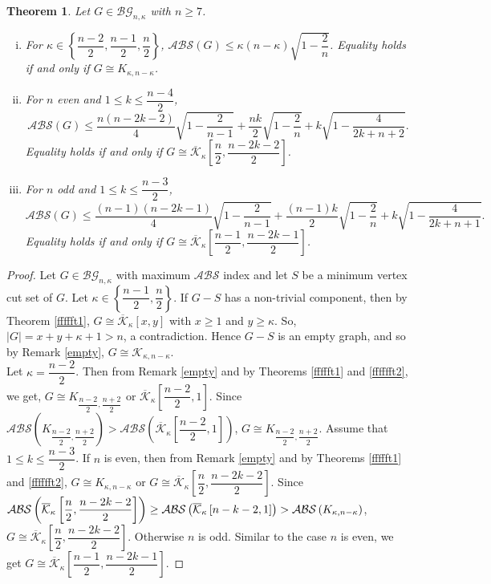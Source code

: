 \documentclass[12pt]{article}
\newtheorem{theorem}{Theorem}[section]
\begin{document}
\begin{theorem}
Let $G\in \mathcal{BG}_{n,\kappa}$ with $n\ge 7$.  \begin{enumerate}[(i)]
\item For $\kappa\in\left\{\dfrac{n-2}{2},\dfrac{n-1}{2}, \dfrac{n}{2}\right\}$, $\mathcal{ABS}(G)\le \kappa(n-\kappa)\sqrt{1-\dfrac{2}{n}}$. Equality holds if and only if $G\cong K_{\kappa,n-\kappa}$.
\item For $n$ even and $1\le k\le \dfrac{n-4}{2}$,  $$\mathcal{ABS}(G)\le \dfrac{n(n-2k-2)}{4}\sqrt{1-\dfrac{2}{n-1}}+\dfrac{nk}{2}\sqrt{1-\dfrac{2}{n}}+k\sqrt{1-\dfrac{4}{2k+n+2}}.$$ Equality holds if and only if $G\cong \overline{\mathcal{K}}_{\kappa}\left[\dfrac{n}{2},\dfrac{n-2k-2}{2}\right]$.
\item For  $n$ odd and $1\le k\le \dfrac{n-3}{2}$, $$\mathcal{ABS}(G)\le \dfrac{(n-1)(n-2k-1)}{4}\sqrt{1-\dfrac{2}{n-1}}+\dfrac{(n-1)k}{2}\sqrt{1-\dfrac{2}{n}}+k\sqrt{1-\dfrac{4}{2k+n+1}}.$$ Equality holds if and only if $G\cong \overline{\mathcal{K}}_{\kappa}\left[\dfrac{n-1}{2},\dfrac{n-2k-1}{2}\right]$.
\end{enumerate}
\end{theorem}
\begin{proof}
Let $G\in \mathcal{BG}_{n,\kappa}$ with  maximum $\mathcal{ABS}$ index and let $S$ be a minimum vertex cut set of $G$. Let $\kappa\in\left\{\dfrac{n-1}{2}, \dfrac{n}{2}\right\}$. If $G-S$ has a non-trivial component, then by Theorem \ref{ffffft1},  $G\cong \overline{\mathcal{K}}_{\kappa}[x,y]$ with $x\ge 1$ and $y\ge \kappa$. So, $|G|=x+y+\kappa+1>n$, a contradiction. Hence $G-S$ is an empty graph, and so by Remark \ref{empty}, $G\cong \mathcal{K}_{\kappa,n-\kappa}$.\\[2mm]
Let $\kappa=\dfrac{n-2}{2}$. Then from Remark \ref{empty} and by Theorems \ref{ffffft1} and \ref{fffffft2}, we get, $G\cong K_{\dfrac{n-2}{2},\dfrac{n+2}{2}}$ or $\overline{\mathcal{K}}_{\kappa}\left[\dfrac{n-2}{2},1\right]$. Since $\mathcal{ABS}\left(K_{\dfrac{n-2}{2},\dfrac{n+2}{2}}\right)>\mathcal{ABS}\left(\overline{\mathcal{K}}_{\kappa}\left[\dfrac{n-2}{2},1\right]\right)$, $G\cong K_{\dfrac{n-2}{2},\dfrac{n+2}{2}}$.        
Assume that $1\le k\le \dfrac{n-3}{2}$. If $n$ is even, then from Remark \ref{empty} and by Theorems \ref{ffffft1} and \ref{fffffft2}, $G\cong K_{\kappa,n-\kappa}$  or $G\cong \overline{\mathcal{K}}_{\kappa}\left[\dfrac{n}{2},\dfrac{n-2k-2}{2}\right]$.
Since ${\small\mathcal{ABS}\left(\overline{\mathcal{K}}_{\kappa}\left[\dfrac{n}{2},\dfrac{n-2k-2}{2}\right]\right)}\\\ge 
\mathcal{ABS}\left(\overline{\mathcal{K}}_{\kappa}\left[n-k-2,1\right]\right)>\mathcal{ABS}\left(K_{\kappa,n-\kappa}\right)$, $G\cong \overline{\mathcal{K}}_{\kappa}\left[\dfrac{n}{2},\dfrac{n-2k-2}{2}\right]$. Otherwise $n$ is odd. Similar to the case $n$ is even, we get $G\cong \overline{\mathcal{K}}_{\kappa}\left[\dfrac{n-1}{2},\dfrac{n-2k-1}{2}\right]$.    
\end{proof}
\end{document}
